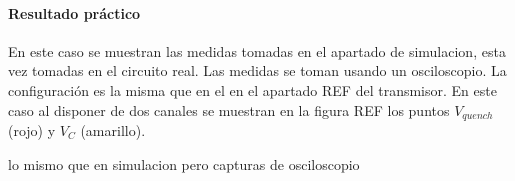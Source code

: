 \paragraph{Resultado práctico} En este caso se muestran las medidas tomadas en el apartado de simulacion, esta vez tomadas en el circuito real. Las medidas se toman usando un osciloscopio. 
La configuración es la misma que en el en el apartado REF del transmisor. En este caso al disponer de dos canales se muestran en la figura REF los puntos $V_{quench}$ (rojo) y $V_{C}$ (amarillo).

lo mismo que en simulacion pero capturas de osciloscopio
